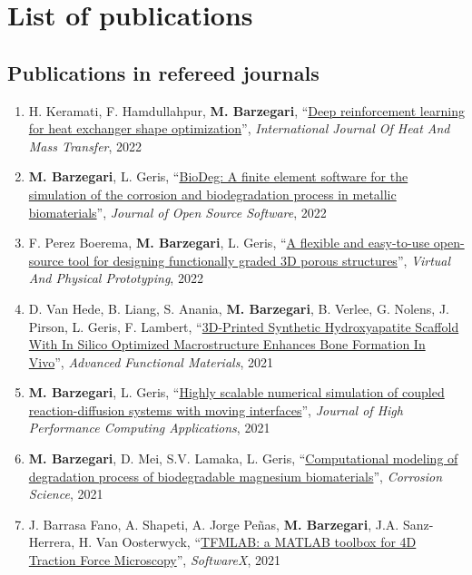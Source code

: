 \chapter{List of publications}\label{ch:publications}



\section*{Publications in refereed journals}

\begin{enumerate}
\item
H. Keramati, F. Hamdullahpur, \textbf{M. Barzegari}, ``\href{https://doi.org/10.1016/j.ijheatmasstransfer.2022.123112}{Deep reinforcement learning for heat exchanger shape optimization}'', \textit{International  Journal Of Heat And Mass Transfer}, 2022
\item
\textbf{M. Barzegari}, L. Geris, ``\href{https://doi.org/10.21105/joss.04281}{BioDeg: A finite element software for the simulation of the corrosion and biodegradation process in metallic biomaterials}'', \textit{Journal of Open Source Software}, 2022
\item
F. Perez Boerema, \textbf{M. Barzegari}, L. Geris, ``\href{https://doi.org/10.1080/17452759.2022.2048956}{A flexible and easy-to-use open-source tool for designing functionally graded 3D porous structures}'', \textit{Virtual And Physical Prototyping}, 2022
\item
D. Van Hede, B. Liang, S. Anania, \textbf{M. Barzegari}, B. Verlee, G. Nolens, J. Pirson, L. Geris, F. Lambert, ``\href{https://doi.org/10.1002/adfm.202105002}{3D-Printed Synthetic Hydroxyapatite Scaffold With In Silico Optimized Macrostructure Enhances Bone Formation In Vivo}'', \textit{Advanced Functional Materials}, 2021
\item
\textbf{M. Barzegari}, L. Geris, ``\href{https://doi.org/10.1177/10943420211045939}{Highly scalable numerical simulation of coupled reaction-diffusion systems with moving interfaces}'', \textit{Journal of High Performance Computing Applications}, 2021
\item
\textbf{M. Barzegari}, D. Mei, S.V. Lamaka, L. Geris, ``\href{https://doi.org/10.1016/j.corsci.2021.109674}{Computational modeling of degradation process of biodegradable magnesium biomaterials}'', \textit{Corrosion Science}, 2021
\item
J. Barrasa Fano, A. Shapeti, A. Jorge Peñas, \textbf{M. Barzegari}, J.A. Sanz-Herrera, H. Van Oosterwyck, ``\href{https://doi.org/10.1016/j.softx.2021.100723}{TFMLAB: a MATLAB toolbox for 4D Traction Force Microscopy}'', \textit{SoftwareX}, 2021 

\end{enumerate}
